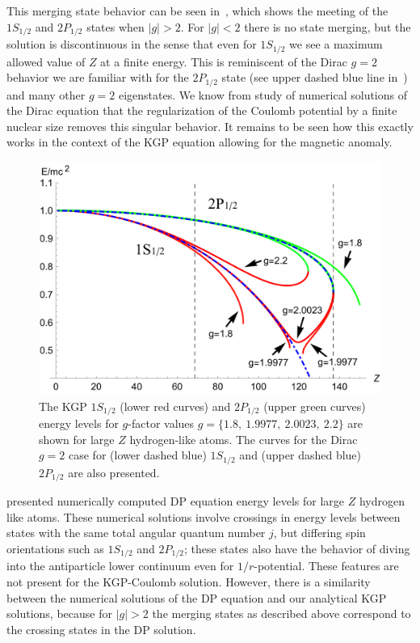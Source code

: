 This merging state behavior can be seen in~, which shows the meeting of the $1S_{1/2}$ and $2P_{1/2}$ states when $|g|\!>\!2$. For $|g|\!<\!2$ there is no state merging, but the solution is discontinuous in the sense that even for $1S_{1/2}$ we see a maximum allowed value of $Z$ at a finite energy. This is reminiscent of the Dirac $g\!=\!2$ behavior we are familiar with for the $2P_{1/2}$ state (see upper dashed blue line in~) and many other $g\!=\!2$ eigenstates. We know from study of numerical solutions of the Dirac equation that the regularization of the Coulomb potential by a finite nuclear size removes this singular behavior. It remains to be seen how this exactly works in the context of the KGP equation allowing for the magnetic anomaly.

\begin{figure}[ht]
    \centering
    \includegraphics[width=\linewidth]{plots/chap02moment/lanplot08.pdf}
     \caption{The KGP $1S_{1/2}$ (lower red curves) and $2P_{1/2}$ (upper green curves) energy levels for $g$-factor values $g\!=\!\{1.8,\ 1.9977,\ 2.0023,\ 2.2\}$ are shown for large $Z$ hydrogen-like atoms. The curves for the Dirac $g\!=\!2$ case for (lower dashed blue) $1S_{1/2}$ and (upper dashed blue) $2P_{1/2}$ are also presented.}
    \label{f03}
\end{figure}

\cite{Thaller:1992ji} presented numerically computed DP equation energy levels for large $Z$ hydrogen like atoms. These numerical solutions involve crossings in energy levels between states with the same total angular quantum number $j$, but differing spin orientations such as $1S_{1/2}$ and $2P_{1/2}$; these states also have the behavior of diving into the antiparticle lower continuum even for $1/r$-potential. These features are not present for the KGP-Coulomb solution. However, there is a similarity between the numerical solutions of the DP equation and our analytical KGP solutions, because for $|g|>2$ the merging states as described above correspond to the crossing states in the DP solution.

